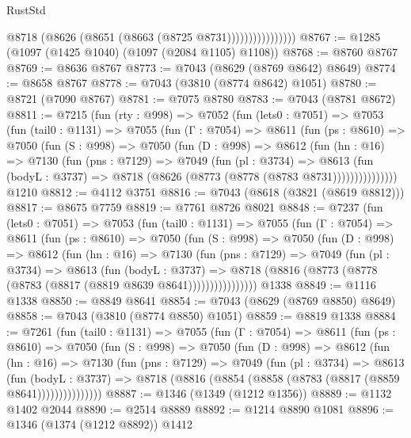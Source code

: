 \begin{lexlean}{RustStd}
\begin{coremodule}
                          @8718 (@8626 (@8651 (@8663 (@8725 @8731))))))))))))))))
@8767 := @1285 (@1097 (@1425 @1040) (@1097 (@2084 @1105) @1108))
@8768 := @8760 @8767
@8769 := @8636 @8767
@8773 := @7043 (@8629 (@8769 @8642) @8649)
@8774 := @8658 @8767
@8778 := @7043 (@3810 (@8774 @8642) @1051)
@8780 := @8721 (@7090 @8767)
@8781 := @7075 @8780
@8783 := @7043 (@8781 @8672)
@8811 := @7215
    (fun (rty : @998) =>
    @7052
      (fun (lets0 : @7051) =>
      @7053
        (fun (tail0 : @1131) =>
        @7055
          (fun (Γ : @7054) =>
          @8611
            (fun (ps : @8610) =>
            @7050
              (fun (S : @998) =>
              @7050
                (fun (D : @998) =>
                @8612
                  (fun (hn : @16) =>
                  @7130
                    (fun (pns : @7129) =>
                    @7049
                      (fun (pl : @3734) =>
                      @8613
                        (fun (bodyL : @3737) =>
                        @8718 (@8626 (@8773 (@8778 (@8783 @8731)))))))))))))))
    @1210
@8812 := @4112 @3751
@8816 := @7043 (@8618 (@3821 (@8619 @8812)))
@8817 := @8675 @7759
@8819 := @7761 @8726 @8021
@8848 := @7237
    (fun (lets0 : @7051) =>
    @7053
      (fun (tail0 : @1131) =>
      @7055
        (fun (Γ : @7054) =>
        @8611
          (fun (ps : @8610) =>
          @7050
            (fun (S : @998) =>
            @7050
              (fun (D : @998) =>
              @8612
                (fun (hn : @16) =>
                @7130
                  (fun (pns : @7129) =>
                  @7049
                    (fun (pl : @3734) =>
                    @8613
                      (fun (bodyL : @3737) =>
                      @8718 (@8816 (@8773 (@8778 (@8783 (@8817 (@8819 @8639 @8641))))))))))))))))
    @1338
@8849 := @1116 @1338
@8850 := @8849 @8641
@8854 := @7043 (@8629 (@8769 @8850) @8649)
@8858 := @7043 (@3810 (@8774 @8850) @1051)
@8859 := @8819 @1338
@8884 := @7261
    (fun (tail0 : @1131) =>
    @7055
      (fun (Γ : @7054) =>
      @8611
        (fun (ps : @8610) =>
        @7050
          (fun (S : @998) =>
          @7050
            (fun (D : @998) =>
            @8612
              (fun (hn : @16) =>
              @7130
                (fun (pns : @7129) =>
                @7049
                  (fun (pl : @3734) =>
                  @8613
                    (fun (bodyL : @3737) =>
                    @8718 (@8816 (@8854 (@8858 (@8783 (@8817 (@8859 @8641)))))))))))))))
@8887 := @1346 (@1349 (@1212 @1356))
@8889 := @1132 @1402 @2044
@8890 := @2514 @8889
@8892 := @1214 @8890 @1081
@8896 := @1346 (@1374 (@1212 @8892)) @1412

\end{coremodule}
\end{lexlean}
